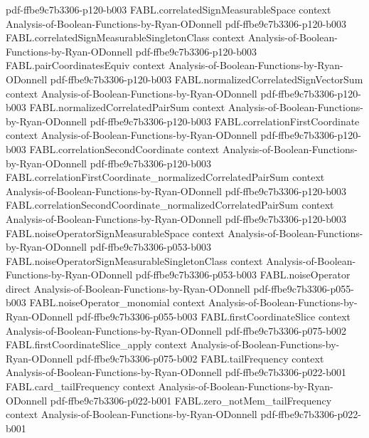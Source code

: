 \begin{theorem}
  {pdf-ffbe9c7b3306-p120-b003}
\proofstep
  {FABL.correlatedSignMeasurableSpace}
  {context}
  {Analysis-of-Boolean-Functions-by-Ryan-ODonnell}
  {pdf-ffbe9c7b3306-p120-b003}
\proofstep
  {FABL.correlatedSignMeasurableSingletonClass}
  {context}
  {Analysis-of-Boolean-Functions-by-Ryan-ODonnell}
  {pdf-ffbe9c7b3306-p120-b003}
\proofstep
  {FABL.pairCoordinatesEquiv}
  {context}
  {Analysis-of-Boolean-Functions-by-Ryan-ODonnell}
  {pdf-ffbe9c7b3306-p120-b003}
\proofstep
  {FABL.normalizedCorrelatedSignVectorSum}
  {context}
  {Analysis-of-Boolean-Functions-by-Ryan-ODonnell}
  {pdf-ffbe9c7b3306-p120-b003}
\proofstep
  {FABL.normalizedCorrelatedPairSum}
  {context}
  {Analysis-of-Boolean-Functions-by-Ryan-ODonnell}
  {pdf-ffbe9c7b3306-p120-b003}
\proofstep
  {FABL.correlationFirstCoordinate}
  {context}
  {Analysis-of-Boolean-Functions-by-Ryan-ODonnell}
  {pdf-ffbe9c7b3306-p120-b003}
\proofstep
  {FABL.correlationSecondCoordinate}
  {context}
  {Analysis-of-Boolean-Functions-by-Ryan-ODonnell}
  {pdf-ffbe9c7b3306-p120-b003}
\proofstep
  {FABL.correlationFirstCoordinate_normalizedCorrelatedPairSum}
  {context}
  {Analysis-of-Boolean-Functions-by-Ryan-ODonnell}
  {pdf-ffbe9c7b3306-p120-b003}
\proofstep
  {FABL.correlationSecondCoordinate_normalizedCorrelatedPairSum}
  {context}
  {Analysis-of-Boolean-Functions-by-Ryan-ODonnell}
  {pdf-ffbe9c7b3306-p120-b003}
\proofstep
  {FABL.noiseOperatorSignMeasurableSpace}
  {context}
  {Analysis-of-Boolean-Functions-by-Ryan-ODonnell}
  {pdf-ffbe9c7b3306-p053-b003}
\proofstep
  {FABL.noiseOperatorSignMeasurableSingletonClass}
  {context}
  {Analysis-of-Boolean-Functions-by-Ryan-ODonnell}
  {pdf-ffbe9c7b3306-p053-b003}
\proofstep
  {FABL.noiseOperator}
  {direct}
  {Analysis-of-Boolean-Functions-by-Ryan-ODonnell}
  {pdf-ffbe9c7b3306-p055-b003}
\proofstep
  {FABL.noiseOperator_monomial}
  {context}
  {Analysis-of-Boolean-Functions-by-Ryan-ODonnell}
  {pdf-ffbe9c7b3306-p055-b003}
\proofstep
  {FABL.firstCoordinateSlice}
  {context}
  {Analysis-of-Boolean-Functions-by-Ryan-ODonnell}
  {pdf-ffbe9c7b3306-p075-b002}
\proofstep
  {FABL.firstCoordinateSlice_apply}
  {context}
  {Analysis-of-Boolean-Functions-by-Ryan-ODonnell}
  {pdf-ffbe9c7b3306-p075-b002}
\proofstep
  {FABL.tailFrequency}
  {context}
  {Analysis-of-Boolean-Functions-by-Ryan-ODonnell}
  {pdf-ffbe9c7b3306-p022-b001}
\proofstep
  {FABL.card_tailFrequency}
  {context}
  {Analysis-of-Boolean-Functions-by-Ryan-ODonnell}
  {pdf-ffbe9c7b3306-p022-b001}
\proofstep
  {FABL.zero_notMem_tailFrequency}
  {context}
  {Analysis-of-Boolean-Functions-by-Ryan-ODonnell}
  {pdf-ffbe9c7b3306-p022-b001}

\end{theorem}
